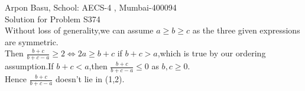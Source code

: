 \documentclass[10pt,a4paper]{extarticle}
\begin{document}
Arpon Basu, School: AECS-4 , Mumbai-400094\\
Solution for Problem S374 \\
Without loss of generality,we can assume $a\geq b\geq c$ as the three given expressions are symmetric.\\
Then $\frac{b+c}{b+c-a}\geq 2\Leftrightarrow 2a\geq b+c$ if $b+c>a$,which is true by our ordering assumption.If $b+c<a$,then $\frac{b+c}{b+c-a}\leq 0$ as $b,c\geq 0$.\\
Hence $\frac{b+c}{b+c-a}$ doesn't lie in (1,2).
\end{document}
